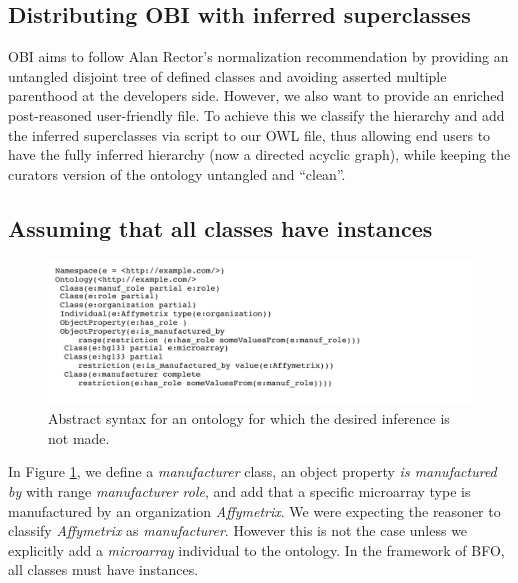 \documentclass{elsart}       %
\begin{document}
\subsection{Distributing OBI with inferred superclasses}

OBI aims to follow Alan Rector's\cite{rector} normalization recommendation by providing an untangled disjoint tree of defined classes and avoiding asserted multiple parenthood at the developers side. However, we also want to provide an enriched post-reasoned user-friendly file.
To achieve this we classify the hierarchy and add the inferred superclasses via script to our OWL file, thus allowing end users to have the fully inferred hierarchy (now a directed acyclic graph), while keeping the curators version of the ontology untangled and ``clean''.

\subsection{Assuming that all classes have instances}

\begin{figure}[t]
\centering \includegraphics*[width=1\columnwidth]{instances}
\caption{Abstract syntax for an ontology for which the desired inference is not made.}
\label{fig:instances}
\end{figure}

In Figure \ref{fig:instances}, we define a \emph{manufacturer} class, an object property \emph{is manufactured by} with range \emph{manufacturer role}, and add that a specific microarray type is manufactured by an organization \emph{Affymetrix}.
We were expecting the reasoner to classify \emph{Affymetrix} as \emph{manufacturer}.
However this is not the case unless we explicitly add a \emph{microarray} individual to the ontology.
In the framework of BFO, all classes must have instances.

\end{document}

